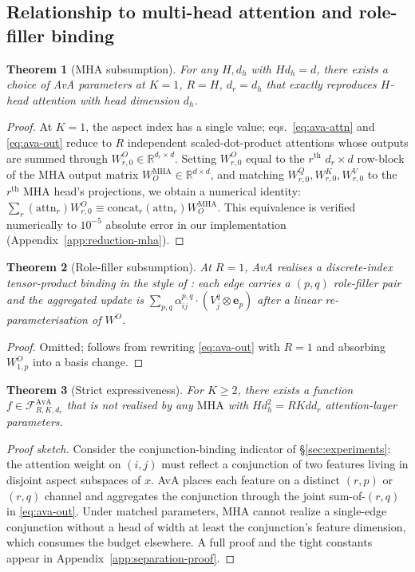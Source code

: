 \documentclass{article}
\newtheorem{theorem}{Theorem}
\newcommand{\R}{\mathbb{R}}
\newcommand{\AvA}{\mathrm{AvA}}
\newcommand{\MHA}{\mathrm{MHA}}
\begin{document}
\subsection{Relationship to multi-head attention and role-filler binding}
\label{sec:relations}

\begin{theorem}[MHA subsumption]
\label{thm:mha}
For any $H, d_h$ with $H d_h = d$, there exists a choice of AvA
parameters at $K{=}1$, $R{=}H$, $d_r{=}d_h$ that exactly reproduces
$H$-head attention with head dimension $d_h$.
\end{theorem}
\begin{proof}
At $K{=}1$, the aspect index has a single value; eqs.~\eqref{eq:ava-attn}
and \eqref{eq:ava-out} reduce to $R$ independent scaled-dot-product
attentions whose outputs are summed through $W^O_{r,0} \in
\R^{d_r \times d}$. Setting $W^O_{r,0}$ equal to the $r^{\text{th}}$
$d_r{\times}d$ row-block of the MHA output matrix $W^{\MHA}_O \in
\R^{d \times d}$, and matching $W^Q_{r,0}, W^K_{r,0}, W^V_{r,0}$ to the
$r^{\text{th}}$ MHA head's projections, we obtain a numerical identity:
$\sum_r (\mathrm{attn}_r) W^O_{r,0} \equiv \mathrm{concat}_r(\mathrm{attn}_r) W^{\MHA}_O$.
This equivalence is verified numerically to $10^{-5}$ absolute error
in our implementation (Appendix~\ref{app:reduction-mha}).
\end{proof}

\begin{theorem}[Role-filler subsumption]
\label{thm:rf}
At $R{=}1$, AvA realises a discrete-index tensor-product binding in the
style of \citet{smolensky1990tensor}: each edge carries a
$(p, q)$ role-filler pair and the aggregated update is
$\sum_{p, q} \alpha^{p,q}_{ij} \cdot (V_j^q \otimes \mathbf{e}_p)$ after
a linear re-parameterisation of $W^O$.
\end{theorem}
\begin{proof}
Omitted; follows from rewriting \eqref{eq:ava-out} with $R{=}1$ and
absorbing $W^O_{1,p}$ into a basis change.
\end{proof}

\begin{theorem}[Strict expressiveness]
\label{thm:strict}
For $K \ge 2$, there exists a function
$f \in \mathcal{F}^{\AvA}_{R, K, d_r}$ that is \emph{not} realised by
any $\mathrm{MHA}$ with $H d_h^2 = R K d d_r$ attention-layer
parameters.
\end{theorem}
\begin{proof}[Proof sketch]
Consider the conjunction-binding indicator of
\S\ref{sec:experiments}: the attention weight on $(i, j)$ must reflect
a conjunction of two features living in disjoint aspect subspaces of
$x$. AvA places each feature on a distinct $(r, p)$ or $(r, q)$ channel
and aggregates the conjunction through the joint sum-of-$(r, q)$ in
\eqref{eq:ava-out}. Under matched parameters, MHA cannot realize a
single-edge conjunction without a head of width at least the
conjunction's feature dimension, which consumes the budget elsewhere.
A full proof and the tight constants appear in
Appendix~\ref{app:separation-proof}.
\end{proof}
\end{document}
